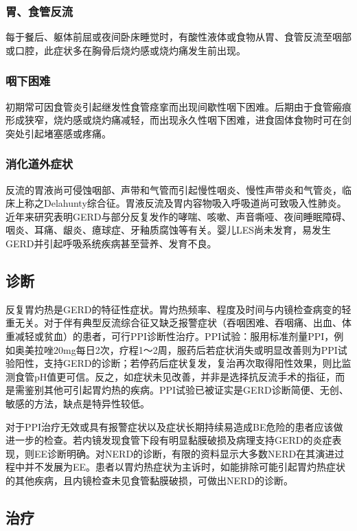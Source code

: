 \subsubsection{胃、食管反流}

每于餐后、躯体前屈或夜间卧床睡觉时，有酸性液体或食物从胃、食管反流至咽部或口腔，此症状多在胸骨后烧灼感或烧灼痛发生前出现。

\subsubsection{咽下困难}

初期常可因食管炎引起继发性食管痉挛而出现间歇性咽下困难。后期由于食管瘢痕形成狭窄，烧灼感或烧灼痛减轻，而出现永久性咽下困难，进食固体食物时可在剑突处引起堵塞感或疼痛。

\subsubsection{消化道外症状}

反流的胃液尚可侵蚀咽部、声带和气管而引起慢性咽炎、慢性声带炎和气管炎，临床上称之Delahunty综合征。胃液反流及胃内容物吸入呼吸道尚可致吸入性肺炎。近年来研究表明GERD与部分反复发作的哮喘、咳嗽、声音嘶哑、夜间睡眠障碍、咽炎、耳痛、龈炎、癔球症、牙釉质腐蚀等有关。婴儿LES尚未发育，易发生GERD并引起呼吸系统疾病甚至营养、发育不良。

\subsection{诊断}

反复胃灼热是GERD的特征性症状。胃灼热频率、程度及时间与内镜检查病变的轻重无关。对于伴有典型反流综合征又缺乏报警症状（吞咽困难、吞咽痛、出血、体重减轻或贫血）的患者，可行PPI诊断性治疗。PPI试验：服用标准剂量PPI，例如奥美拉唑20mg每日2次，疗程1～2周，服药后若症状消失或明显改善则为PPI试验阳性，支持GERD的诊断；若停药后症状复发，复治再次取得阳性效果，则比监测食管pH值更可信。反之，如症状未见改善，并非是选择抗反流手术的指征，而是需鉴别其他可引起胃灼热的疾病。PPI试验已被证实是GERD诊断简便、无创、敏感的方法，缺点是特异性较低。

对于PPI治疗无效或具有报警症状以及症状长期持续易造成BE危险的患者应该做进一步的检查。若内镜发现食管下段有明显黏膜破损及病理支持GERD的炎症表现，则EE诊断明确。对NERD的诊断，有限的资料显示大多数NERD在其演进过程中并不发展为EE。患者以胃灼热症状为主诉时，如能排除可能引起胃灼热症状的其他疾病，且内镜检查未见食管黏膜破损，可做出NERD的诊断。

\subsection{治疗}

